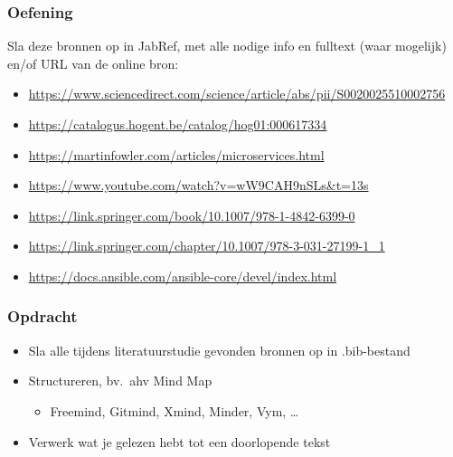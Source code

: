 \documentclass[aspectratio=169]{beamer}
\begin{document}
\begin{frame}[plain]
  \frametitle{Oefening}

  Sla deze bronnen op in JabRef, met alle nodige info en fulltext (waar mogelijk) en/of URL van de online bron:

  \bigskip

  \begin{itemize}
    \item \url{https://www.sciencedirect.com/science/article/abs/pii/S0020025510002756}
    \item \url{https://catalogus.hogent.be/catalog/hog01:000617334}
    \item \url{https://martinfowler.com/articles/microservices.html}
    \item \url{https://www.youtube.com/watch?v=wW9CAH9nSLs&t=13s}
    \item \url{https://link.springer.com/book/10.1007/978-1-4842-6399-0}
    \item \url{https://link.springer.com/chapter/10.1007/978-3-031-27199-1_1}
    \item \url{https://docs.ansible.com/ansible-core/devel/index.html}
  \end{itemize}

\end{frame}

\begin{frame}
  \frametitle{Opdracht}

  \begin{itemize}
    \item Sla alle tijdens literatuurstudie gevonden bronnen op in .bib-bestand
    \item Structureren, bv.\ ahv Mind Map
          \begin{itemize}
            \item Freemind, Gitmind, Xmind, Minder, Vym, \ldots
          \end{itemize}
    \item Verwerk wat je gelezen hebt tot een doorlopende tekst
  \end{itemize}

  \bigskip

\end{frame}
\end{document}
